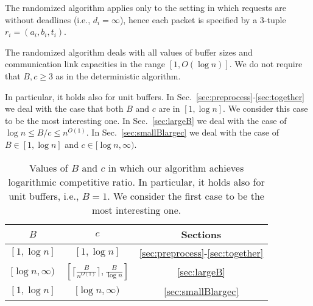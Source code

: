 \documentclass[11pt]{article}
\newenvironment{proof sketch}[1]{\noindent {\emph{Proof sketch of #1:}}}{\hfill \qed}
\begin{document}
\begin{comment}
Recall that a unidirectional line network with $n$ nodes is a directed path
$G=(V,E)$. The vertices are denoted by $V=\{v_0,v_1,\ldots,v_{n-1}\}$.  The set of
directed edges is $E=\{(v_i,v_{i+1})\::\:0\leq i\leq n-2\}$.
The parameters of the line network are: $n$ nodes, buffer size $B$ in
each node, and link capacity $c$.  We assume that $B,c\in[1,\log n]$.

We assume that (i)~all edges have identical capacities, denoted by $c$,
(ii)~all nodes have the same buffer size, denoted by $B$, and (iii)
\end{comment}
The randomized algorithm applies only to the setting in which requests are {without} deadlines (i.e., $d_i = \infty$),
hence each packet is specified by a $3$-tuple $r_i=(a_i,b_i,t_i)$.

The randomized algorithm deals with all values of buffer sizes and communication link
capacities in the range $[1,O(\log n)]$. We do not require that $B,c\geq 3$ as in the
deterministic algorithm.

In particular, it holds also for unit buffers.  In
Sec.~\ref{sec:preprocess}-\ref{sec:together} we deal with
the case that both $B$ and $c$ are in $[1,\log n]$. We
consider this case to be the most interesting one. In
Sec.~\ref{sec:largeB} we deal with the case of $\log n\leq
B/c\leq n^{O(1)}$.  In Sec.~\ref{sec:smallBlargec} we deal
with the case of $B \in [1,\log n]$ and $c \in [\log n,
\infty)$.

\renewcommand{\arraystretch}{2}
\begin{table}[H]
\begin{centering}
\begin{tabular}{|c|c|c|}
\hline
$B$ & $c$ & Sections\tabularnewline
\hline
\hline
$[1,\log n]$ & $[1,\log n]$ & \ref{sec:preprocess}-\ref{sec:together} \tabularnewline
\hline
$[\log n, \infty)$ & $\left[\lceil \frac{B}{n^{O(1)}}\rceil, \frac{B}{\log n}\right]$ & \ref{sec:largeB}\tabularnewline
\hline
$[1,\log n]$ & $[\log n, \infty)$ & \ref{sec:smallBlargec}\tabularnewline
\hline
\end{tabular}
\par\end{centering}
\caption{Values of $B$ and $c$ in which our algorithm achieves logarithmic competitive ratio. In particular, it holds also for unit buffers, i.e., $B=1$. We consider the first case to be the most interesting one.}
\label{table:discussion}
\end{table}
\renewcommand{\arraystretch}{1}
\end{document}
